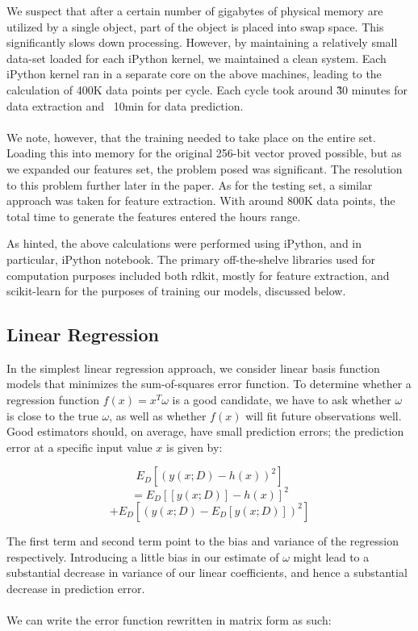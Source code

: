 \documentclass[letterpaper]{article}
\begin{document}
\noindent We suspect that after a certain number of gigabytes of physical memory are utilized by a single object, part of the object is placed into swap space. This significantly slows down processing. However, by maintaining a relatively small data-set loaded for each iPython kernel, we maintained a clean system. Each iPython kernel ran in a separate core on the above machines, leading to the calculation of 400K data points per cycle. Each cycle took around \~30 minutes for data extraction and ~10min for data prediction. \\
\\
\noindent We note, however, that the training needed to take place on the entire set. Loading this into memory for the original 256-bit vector proved possible, but as we expanded our features set, the problem posed was significant. The resolution to this problem further later in the paper. As for the testing set, a similar approach was taken for feature extraction. With around 800K data points, the total time to generate the features entered the hours range.

\noindent As hinted, the above calculations were performed using iPython, and in particular, iPython notebook. The primary off-the-shelve libraries used for computation purposes included both rdkit, mostly for feature extraction, and scikit-learn for the purposes of training our models, discussed below.

\subsection{Linear Regression}
In the simplest linear regression approach, we consider linear basis function models that minimizes the sum-of-squares error function. To determine whether a regression function $f(x) = x^{T} \omega$ is a good candidate, we have to ask whether $\omega$ is close to the true $\omega$, as well as whether $f(x)$ will fit future observations well. Good estimators should, on average, have small prediction errors; the prediction error at a specific input value $x$ is given by:

\begin{center}
$$ E_D [ (y(x;D) - h(x))^2 ]$$
$$= E_D[ [y(x;D)] - h(x)]^2 $$
$$+ E_D [ (y(x;D)-E_D[y(x;D)])^2 ] $$
\end{center} 

\noindent The first term and second term point to the bias and variance of the regression respectively. Introducing a little bias in our estimate of $\omega$ might lead to a substantial decrease in variance of our linear coefficients, and hence a substantial decrease in prediction error.\\
\\
\noindent We can write the error function rewritten in matrix form as such:
\end{document}
